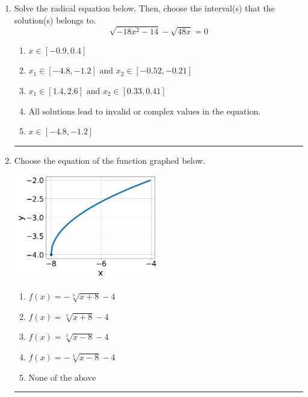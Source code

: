 \documentclass[14pt]{extbook}
\newcommand{\litem}[1]{\item#1\hspace*{-1cm}\rule{\textwidth}{0.4pt}}
\begin{document}
\begin{enumerate}
{\begin{enumerate}[label=\Alph*.]
\end{enumerate} }
\litem{
Solve the radical equation below. Then, choose the interval(s) that the solution(s) belongs to.\[ \sqrt{-18 x^2 - 14} - \sqrt{48 x} = 0 \]\begin{enumerate}[label=\Alph*.]
\item \( x \in [-0.9,0.4] \)
\item \( x_1 \in [-4.8, -1.2] \text{ and } x_2 \in [-0.52,-0.21] \)
\item \( x_1 \in [1.4, 2.6] \text{ and } x_2 \in [0.33,0.41] \)
\item \( \text{All solutions lead to invalid or complex values in the equation.} \)
\item \( x \in [-4.8,-1.2] \)

\end{enumerate} }
\litem{
Choose the equation of the function graphed below.
\begin{center}
    \includegraphics[width=0.5\textwidth]{../Figures/radicalGraphToEquationCopyA.png}
\end{center}
\begin{enumerate}[label=\Alph*.]
\item \( f(x) = - \sqrt[3]{x + 8} - 4 \)
\item \( f(x) = \sqrt[3]{x + 8} - 4 \)
\item \( f(x) = \sqrt[3]{x - 8} - 4 \)
\item \( f(x) = - \sqrt[3]{x - 8} - 4 \)
\item \( \text{None of the above} \)


\end{enumerate}}
\end{enumerate}
\end{document}
